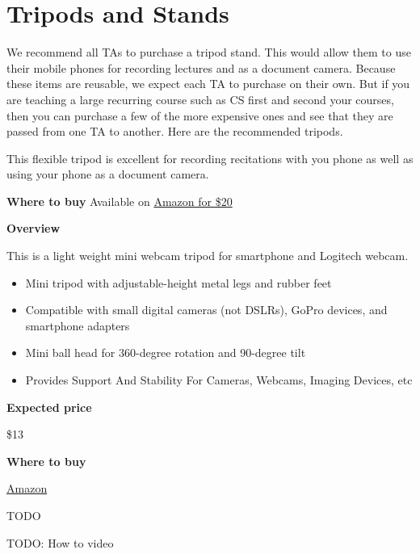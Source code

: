 \section{Tripods and Stands}

We recommend all TAs to purchase a tripod stand. This would allow them to use their mobile phones for recording lectures and as a document camera.  
%
Because these items are reusable, we expect each TA to purchase on their own.
%
But if you are teaching a large recurring course such as CS first and
second your courses, then you can purchase a few of the more expensive
ones and see that they are passed from one TA to another.
%
Here are the recommended tripods.

\begin{gram}

This flexible tripod is excellent for recording recitations with you phone as well as using your phone as a document camera.

\textbf{Where to buy}
Available on 
\href{
https://www.amazon.com/gp/product/B07837W5NX/ref=ppx_yo_dt_b_search_asin_title?ie=UTF8&psc=1}
{Amazon for \$20}
\end{gram}

\begin{gram}
\label{grm:equipment::tripod::mamawin::main}

\textbf{Overview}

This is a light weight mini webcam tripod for smartphone and Logitech webcam.
%
\begin{itemize}
\item
Mini tripod with adjustable-height metal legs and rubber feet

\item
Compatible with small digital cameras (not DSLRs), GoPro devices, and smartphone adapters 

\item
Mini ball head for 360-degree rotation and 90-degree tilt

\item
Provides Support And Stability For Cameras, Webcams, Imaging Devices, etc

\end{itemize}



\textbf{Expected price}

\$13

\textbf{Where to buy}

\href{https://www.amazon.com/Lightweight-Webcam-Tripod-Logitech-Camera/dp/B076SHC6RN/ref=sr_1_1_sspa?crid=2T6CQ3HNRR1XR&keywords=logitech+c920&qid=1582900721&s=electronics&sprefix=logitech+c,electronics,172&sr=1-1-spons&psc=1&spLa=ZW5jcnlwdGVkUXVhbGlmaWVyPUE1VjVUUFpKTU83QUkmZW5jcnlwdGVkSWQ9QTA1NTk1OTVLT1IyTzdRRFVEWkImZW5jcnlwdGVkQWRJZD1BMDEyNzk2NzEyTDVSOEdSQ1QxTEgmd2lkZ2V0TmFtZT1zcF9hdGYmYWN0aW9uPWNsaWNrUmVkaXJlY3QmZG9Ob3RMb2dDbGljaz10cnVl}{Amazon}

\end{gram}



\begin{gram}
TODO
\end{gram}


\begin{gram}[How]
TODO: How to video
\end{gram}
